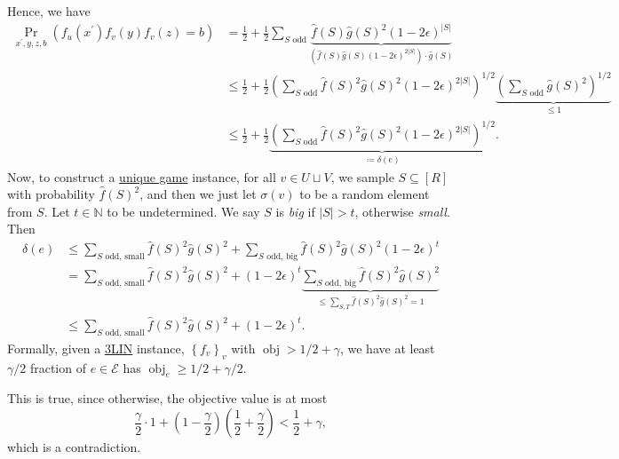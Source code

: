 Hence, we have
\[
	\begin{split}
		\Pr_{x^\prime, y, z, b}(f_u(x^\prime ) f_v(y) f_v(z) = b)
		&= \frac{1}{2} + \frac{1}{2} \sum_{\text{\(S\) odd}} \underbrace{\hat{f} (S) \hat{g} (S)^{2} (1-2\epsilon ) ^{\vert S \vert }}_{(\hat{f} (S)\hat{g} (S) (1-2\epsilon )^{2 \vert S \vert })\cdot \hat{g} (S)}\\
		&\leq \frac{1}{2} + \frac{1}{2} \left( \sum_{\text{\(S\) odd}} \hat{f} (S)^2 \hat{g} (S)^2 (1-2\epsilon )^{2 \vert S \vert } \right)^{1/2} \underbrace{\left( \sum_{\text{\(S\) odd}} \hat{g} (S)^2 \right) ^{1 / 2}}_{\leq 1}\\
		&\leq \frac{1}{2} + \frac{1}{2} \underbrace{\left( \sum_{\text{\(S\) odd}} \hat{f} (S)^2 \hat{g} (S)^2 (1-2\epsilon )^{2 \vert S \vert } \right) ^{1 / 2}}_{\coloneqq \delta (e)}.
	\end{split}
\]
Now, to construct a \hyperref[prb:unique-game]{unique game} instance, for all \(v\in U \sqcup V\), we sample \(S \subseteq [R]\) with probability \(\hat{f} (S)^2\), and then we just let \(\sigma (v)\) to be a random element from \(S\). Let \(t\in \mathbb{N} \) to be undetermined. We say \(S\) is \emph{big} if \(\vert S \vert > t\), otherwise \emph{small}. Then
\[
	\begin{split}
		\delta (e)
		&\leq \sum_{\text{\(S\) odd, small}} \hat{f} (S)^2 \hat{g} (S)^2 + \sum_{\text{\(S\) odd, big}} \hat{f} (S)^2 \hat{g} (S)^2 (1-2\epsilon )^t\\
		&= \sum_{\text{\(S\) odd, small}} \hat{f} (S)^2 \hat{g} (S)^2 + (1-2\epsilon )^t \underbrace{\sum_{\text{\(S\) odd, big}} \hat{f} (S)^2 \hat{g} (S)^2}_{\leq \sum_{S, T} \hat{f} (S)^2 \hat{g} (S)^2 = 1}\\
		&\leq \sum_{\text{\(S\) odd, small}} \hat{f} (S)^2 \hat{g} (S)^2 + (1-2\epsilon )^t.
	\end{split}
\]
Formally, given a \hyperref[prb:max-3LIN]{3LIN} instance, \(\left\{ f_v \right\} _{v}\) with \(\mathop{\mathrm{obj}} > 1/2 + \gamma \), we have at least \(\gamma / 2\) fraction of \(e\in \mathcal{E} \) has \(\mathop{\mathrm{obj}}_e \geq 1 / 2 + \gamma /2\).

\begin{note}
	This is true, since otherwise, the objective value is at most
	\[
		\frac{\gamma}{2}\cdot 1 + \left( 1 - \frac{\gamma}{2} \right) \left( \frac{1}{2}+ \frac{\gamma}{2} \right)  < \frac{1}{2} + \gamma ,
	\]
	which is a contradiction.
\end{note}

